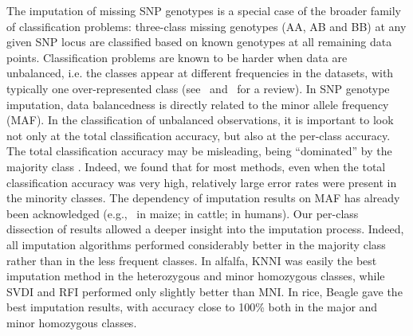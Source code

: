 The imputation of missing SNP genotypes is a special case of the broader family of classification problems: three-class missing genotypes (AA, AB and BB) at any given SNP locus are classified based on known genotypes at all remaining data points. Classification problems are known to be harder when data are unbalanced, i.e. the classes appear at different frequencies in the datasets, with typically one over-represented class
(see~\cite{kotsiantis_handling_2006}
and~\cite{sun_classification_2009} for a review). In SNP genotype imputation, data balancedness is directly related to the minor allele frequency (MAF). In the classification of unbalanced observations, it is important to look not only at the total classification accuracy, but also at the per-class accuracy. The total classification accuracy may be misleading, being ``dominated'' by the majority class
\cite{he_learning_2009}.
Indeed, we found that for most methods, even when the total classification accuracy was very high, relatively large error rates were present in the minority classes. 
The dependency of imputation results on MAF has already been acknowledged  (e.g.,~\cite{hickey_factors_2012} in maize; \cite{ma_comparison_2013} in cattle; \cite{pei_analyses_2008} in humans). Our per-class dissection of results allowed a deeper insight into the imputation process. Indeed, all imputation algorithms performed considerably better in the majority class rather than in the less frequent classes.
In alfalfa, KNNI was easily the best imputation method in the heterozygous and minor homozygous classes, while SVDI and RFI performed only slightly better than MNI. In rice, Beagle gave the best imputation results, with accuracy close to 100\% both in the major and minor homozygous classes.

